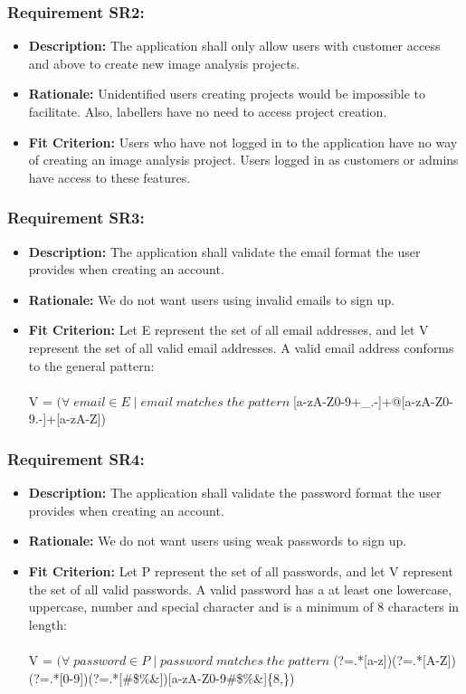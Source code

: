 \documentclass[12pt]{article}
\begin{document}
\subsubsection*{Requirement SR2:}
\begin{itemize}
  \item \textbf{Description:} The application shall only allow users with customer access and above to create new image analysis projects.
  \item \textbf{Rationale:} Unidentified users creating projects would be impossible to facilitate. Also, labellers have no need to access project creation. 
  \item \textbf{Fit Criterion:} Users who have not logged in to the application have no way of creating an image analysis project. Users logged in as customers or admins have access to these features.
\end{itemize}
\subsubsection*{Requirement SR3:}
\begin{itemize}
  \item \textbf{Description:} The application shall validate the email format the user provides when creating an account.
  \item \textbf{Rationale:} We do not want users using invalid emails to sign up.
  \item \textbf{Fit Criterion:} Let E represent the set of all email addresses, and let V represent the set of all valid email addresses. A valid email address conforms to the general pattern:\\\\
  V = $(\forall\; email \in E\;  |\; email \; matches \; the \; pattern \; $[a-zA-Z0-9+\_.-]+@[a-zA-Z0-9.-]+[a-zA-Z])\\
\end{itemize}
\subsubsection*{Requirement SR4:}
\begin{itemize}
  \item \textbf{Description:} The application shall validate the password format the user provides when creating an account.
  \item \textbf{Rationale:} We do not want users using weak passwords to sign up.
  \item \textbf{Fit Criterion:} Let P represent the set of all passwords, and let V represent the set of all valid passwords. A valid password has a at least one lowercase, uppercase, number and special character and is a minimum of 8 characters in length:\\\\
  V = $(\forall\; password \in P\;  |\; password \; matches \; the \; pattern \; $(?=.*[a-z])(?=.*[A-Z])(?=.*[0-9])(?=.*[\#\$\%\&\*\@])[a-zA-Z0-9\#\$\%\&\*\@]\{8,\})\\
\end{itemize}
\end{document}
